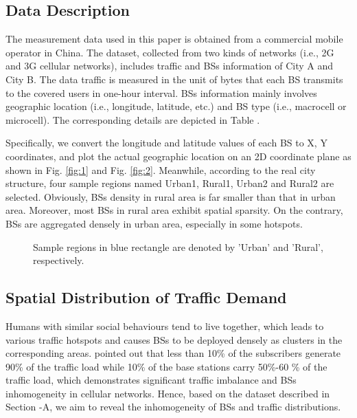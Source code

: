 \subsection{Data Description}
The measurement data used in this paper is obtained from a commercial mobile operator in China. The dataset, collected from two kinds of networks (i.e., 2G and 3G cellular networks), includes traffic and BSs information of City A and City B. The data traffic is measured in the unit of bytes that each BS transmits to the covered users in one-hour interval. BSs information mainly involves geographic location (i.e., longitude, latitude, etc.) and BS type (i.e., macrocell or microcell). The corresponding details are depicted in Table \uppercase\expandafter{}.

Specifically, we convert the longitude and latitude values of each BS to X, Y coordinates, and plot the actual geographic location on an 2D coordinate plane as shown in Fig. \ref{fig:1} and Fig. \ref{fig:2}. Meanwhile, according to the real city structure, four sample regions named Urban1, Rural1, Urban2 and Rural2 are selected. Obviously, BSs density in rural area is far smaller than that in urban area. Moreover, most BSs in rural area exhibit spatial sparsity. On the contrary, BSs are aggregated densely in urban area, especially in some hotspots.
\begin{figure}
	\caption{Sample regions in blue rectangle are denoted by 'Urban' and 'Rural', respectively.}
\end{figure}

\subsection{Spatial Distribution of Traffic Demand}
Humans with similar social behaviours tend to live together, which leads to various traffic hotspots and causes BSs to be deployed densely as clusters in the corresponding areas. \cite{paul2011understanding} pointed out that less than 10\% of the subscribers generate 90\% of the traffic load while 10\% of the base stations carry 50\%-60 \% of the traffic load, which demonstrates significant traffic imbalance and BSs inhomogeneity in cellular networks. Hence, based on the dataset described in Section \uppercase\expandafter{}-{A}, we aim to reveal the inhomogeneity of BSs and traffic distributions.


